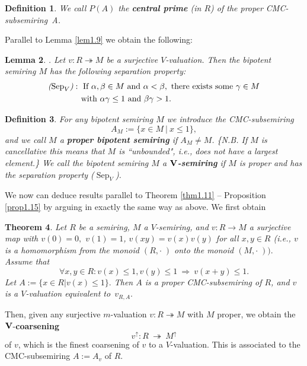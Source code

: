 \documentclass [12pt,a4paper,reqno]{amsart}
\newtheorem{thm}{Theorem} [section]
\newtheorem{lem}[thm]{Lemma}
\newtheorem{defn}[thm]{Definition}
\begin{document}
\begin{defn}\label{defn1.18} We call $P(A)$ the \textbf{central
prime} (in  $R$) of the proper CMC-subsemiring~A.
\end{defn}

Parallel to Lemma \ref{lem1.9} we obtain the following:

\begin{lem}\label{lem1.19} \cite{HV1}.
Let $v: R\twoheadrightarrow  M$ be a surjective $V$-valuation.
Then the bipotent semiring $M$ has the following separation
property:
 \begin{align*}& \text{\emph{(${\operatorname{Sep}}_V$)}}: \ \text{If}\ {\alpha} ,{\beta} \in M \ \text{and}\
 {\alpha} <{\beta} ,\ \text{there exists some} \  {\gamma} \in
 M\\   & \qquad \qquad \text{with}\  {\alpha} {\gamma}  \leq 1\ \text{and}\
{\beta} {\gamma}  >  1.
\end{align*}
\end{lem}

\begin{defn}\label{defn1.20} For any bipotent semiring $M$ we
introduce the CMC-subsemiring
$$ A_M := \{ x\in M {\ {|} \ } x \leq 1\},$$
and we call $M$ a \textbf{proper bipotent semiring} if $A_M \neq
M$. \{N.B. If $M$ is cancellative this means that $M$ is
``unbounded", i.e., does not have a largest element.\} We call the
bipotent semiring $M$ a \textbf{$\bf V$-semiring} if $M$ is proper
and has the separation property (${\operatorname{Sep}}_V$).
\end{defn}

We now  can deduce results parallel to Theorem \ref{thm1.11} --
Proposition \ref{prop1.15} by arguing in exactly the same way as
above. We first obtain

\begin{thm}\label{thm1.21}
Let  $R$ be a semiring, $M$ a $V$-semiring, and $v:R\to M$  a
surjective map with $v(0)=0,$ $v(1)=1$, $v(xy)=v(x)v(y)$ for all
$x,y\in R$ (i.e., $v$ is a homomorphism from the monoid $(R,\cdot
\; )$ onto the monoid $(M,\cdot \; )).$ Assume  that
\begin{equation}\label{1.3}
\forall x,y\in R: v(x)\leq 1,v(y) \leq1\ \Rightarrow\ v(x+y)\leq
1.
\end{equation}
Let $A :=\{x\in R|v(x) \leq 1\}.$ Then $A$ is a proper
CMC-subsemiring of $R$, and $v$ is a $V$-valuation equivalent
to~$v_{R,A }.$
\end{thm}

Then, given any surjective $m$-valuation $v: R \twoheadrightarrow
M$ with $M$ proper, we obtain the  $\bf V$-\textbf{coarsening}
$$ {v^{\uparrow}}: R {\ {\twoheadrightarrow} \ } {M^{\uparrow}}$$
of $v$, which is the finest coarsening of $v$ to a $V$-valuation.
This  is associated to the CMC-subsemiring $A := A_v$ of $R$.
\end{document}

